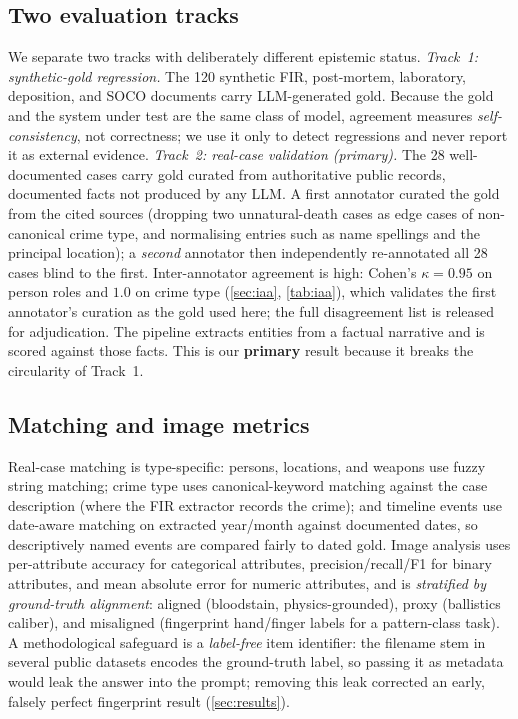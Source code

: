 \documentclass[conference]{IEEEtran}
\begin{document}
\subsection{Two evaluation tracks}
\label{sec:tracks}
We separate two tracks with deliberately different epistemic status.
\emph{Track~1: synthetic-gold regression.} The 120 synthetic FIR, post-mortem,
laboratory, deposition, and SOCO documents carry LLM-generated gold. Because the
gold and the system under test are the same class of model, agreement measures
\emph{self-consistency}, not correctness; we use it only to detect regressions and
never report it as external evidence.
\emph{Track~2: real-case validation (primary).} The 28 well-documented cases
carry gold curated from authoritative public records, documented facts not
produced by any LLM. A first annotator curated the gold from the cited sources
(dropping two unnatural-death cases as edge cases of non-canonical crime type, and
normalising entries such as name spellings and the principal location); a
\emph{second} annotator then independently re-annotated all 28 cases blind to the
first. Inter-annotator agreement is high: Cohen's $\kappa=0.95$ on person roles
and $1.0$ on crime type (\cref{sec:iaa}, \cref{tab:iaa}), which validates the
first annotator's curation as the gold used here; the full disagreement list is
released for adjudication. The pipeline extracts entities from a factual narrative and
is scored against those facts. This is our \textbf{primary} result because it
breaks the circularity of Track~1.

\subsection{Matching and image metrics}
Real-case matching is type-specific: persons, locations, and weapons use fuzzy
string matching; crime type uses canonical-keyword matching against the case
description (where the FIR extractor records the crime); and timeline events use
date-aware matching on extracted year/month against documented dates, so
descriptively named events are compared fairly to dated gold. Image analysis uses
per-attribute accuracy for categorical attributes, precision/recall/F1 for binary
attributes, and mean absolute error for numeric attributes, and is \emph{stratified
by ground-truth alignment}: aligned (bloodstain, physics-grounded), proxy
(ballistics caliber), and misaligned (fingerprint hand/finger labels for a
pattern-class task). A methodological safeguard is a \emph{label-free} item
identifier: the filename stem in several public datasets encodes the ground-truth
label, so passing it as metadata would leak the answer into the prompt; removing
this leak corrected an early, falsely perfect fingerprint result
(\cref{sec:results}).
\end{document}
